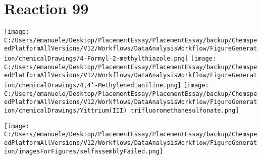 \documentclass{article}%
\begin{document}
\section*{Reaction 99}%
%
\begin{scheme}[H]%
\begin{minipage}{0.5\textwidth}%
\texttt{[image: C:/Users/emanuele/Desktop/PlacementEssay/PlacementEssay/backup/ChemspeedPlatformAllVersions/V12/Workflows/DataAnalysisWorkflow/FigureGeneration/chemicalDrawings/4-Formyl-2-methylthiazole.png]}%
\texttt{[image: C:/Users/emanuele/Desktop/PlacementEssay/PlacementEssay/backup/ChemspeedPlatformAllVersions/V12/Workflows/DataAnalysisWorkflow/FigureGeneration/chemicalDrawings/4,4'-Methylenedianiline.png]}%
\texttt{[image: C:/Users/emanuele/Desktop/PlacementEssay/PlacementEssay/backup/ChemspeedPlatformAllVersions/V12/Workflows/DataAnalysisWorkflow/FigureGeneration/chemicalDrawings/Yittrium(III) trifluoromethanesulfonate.png]}%
\end{minipage}%
\begin{minipage}{0.5\textwidth}%
\begin{center}%
\texttt{[image: C:/Users/emanuele/Desktop/PlacementEssay/PlacementEssay/backup/ChemspeedPlatformAllVersions/V12/Workflows/DataAnalysisWorkflow/FigureGeneration/imagesForFigures/selfassemblyFailed.png]}%
\end{center}%
\end{minipage}%
\caption{Self-assembly of components 1, 17, with Yittrium(III) in a 3.0:1.5:1.0 molar ratio in CH$_3$CN at 60\textdegree C for 40h. These are the reagents (starting materials) for reaction 99.}%
\end{scheme}%
\end{document}

